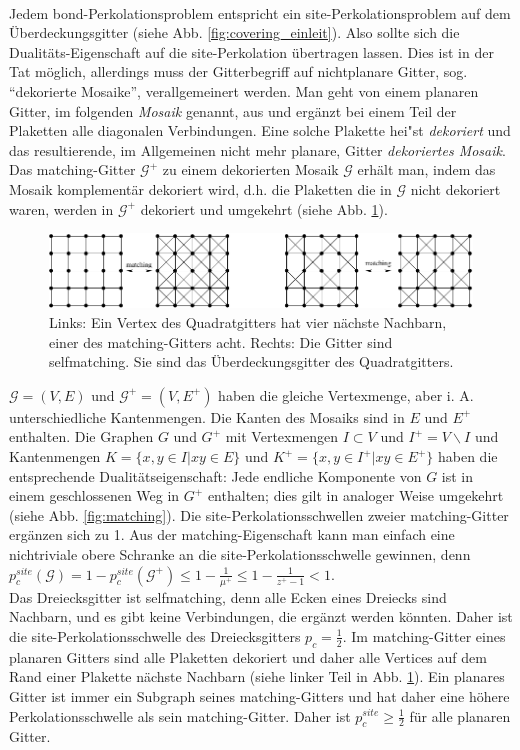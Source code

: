 \\Jedem bond-Perkolationsproblem entspricht ein site-Perkolationsproblem auf dem \"Uberdeckungsgitter (siehe Abb. \ref{fig:covering_einleit}). Also sollte sich die Dualit\"ats-Eigenschaft auf die site-Perkolation \"ubertragen lassen. Dies ist in der Tat m\"oglich, allerdings muss der Gitterbegriff auf nichtplanare Gitter, sog. ``dekorierte Mosaike'', verallgemeinert werden. Man geht von einem planaren Gitter, im folgenden \textit{Mosaik} genannt, aus und erg\"anzt bei einem Teil der Plaketten alle diagonalen Verbindungen. Eine solche Plakette hei"st \textit{dekoriert} und das resultierende, im Allgemeinen nicht mehr planare, Gitter \textit{dekoriertes Mosaik}. Das matching-Gitter  $\mathcal{G}^+$ zu einem dekorierten Mosaik $\mathcal{G}$ erh\"alt man, indem das Mosaik komplement\"ar dekoriert wird, d.h. die Plaketten die in $\mathcal{G}$ nicht dekoriert waren, werden in $\mathcal{G}^+$ dekoriert und umgekehrt (siehe Abb. \ref{fig:matchinggitter}). 
\begin{figure}[tbp]
  \centering
  \includegraphics{./Einleitung-figs/matchinggitter}
  \caption{Links: Ein Vertex des Quadratgitters hat vier n\"achste Nachbarn, einer des matching-Gitters acht. Rechts: Die Gitter sind selfmatching. Sie sind das \"Uberdeckungsgitter des Quadratgitters.}
  \label{fig:matchinggitter}
\end{figure}
$\mathcal{G}=(V,E)$ und $\mathcal{G}^+=(V,E^+)$ haben die gleiche Vertexmenge, aber i. A. unterschiedliche Kantenmengen. Die Kanten des Mosaiks sind in $E$ und $E^+$ enthalten. Die Graphen $G$ und $G^+$ mit Vertexmengen $I \subset V$ und $I^+=V \backslash I$ und Kantenmengen $K=\{x,y\in I|xy \in E\}$ und $K^+=\{x,y\in I^+|xy \in E^+\}$ haben die entsprechende Dualit\"atseigenschaft: Jede endliche Komponente von $G$ ist in einem geschlossenen Weg in $G^+$ enthalten; dies gilt in analoger Weise umgekehrt (siehe Abb. \ref{fig:matching}). Die site-Perkolationsschwellen zweier matching-Gitter erg\"anzen sich zu 1. Aus der matching-Eigenschaft kann man einfach eine nichtriviale obere Schranke an die site-Perkolationsschwelle gewinnen, denn $p_c^{site}(\mathcal{G})=1-p_c^{site}(\mathcal{G}^+) \leq 1-\frac{1}{\mu^+}\leq 1-\frac{1}{z^+-1}<1$.\\
Das Dreiecksgitter ist selfmatching, denn alle Ecken eines Dreiecks sind Nachbarn, und es gibt keine Verbindungen, die erg\"anzt werden k\"onnten. Daher ist die site-Perkolationsschwelle des Dreiecksgitters $p_c=\frac{1}{2}$. Im matching-Gitter eines planaren Gitters sind alle Plaketten dekoriert und daher alle Vertices auf dem Rand einer Plakette n\"achste Nachbarn (siehe linker Teil in Abb. \ref{fig:matchinggitter}). Ein planares Gitter ist immer ein Subgraph seines matching-Gitters und hat daher eine h\"ohere Perkolationsschwelle als sein matching-Gitter. Daher ist $p_c^{site} \geq \frac{1}{2}$ f\"ur alle planaren Gitter.
